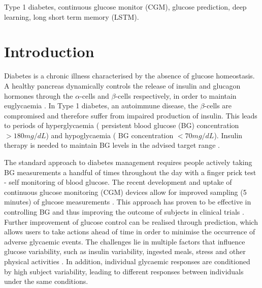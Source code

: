 \documentclass[a4paper, 10 pt, twocolumn]{IEEEtran}
\begin{document}
\begin{IEEEkeywords}
Type 1 diabetes, continuous glucose monitor (CGM), glucose prediction, deep learning, long short term memory (LSTM).
\end{IEEEkeywords}

\linespread{0.97}

\section{Introduction}\label{Section:1}
Diabetes is a chronic illness characterised by the absence of glucose homeostasis. A healthy pancreas dynamically controls the release of insulin and glucagon hormones through the $\alpha$-cells and $\beta$-cells
respectively, in order to maintain euglycaemia \cite{NationalDia-ClassDia1979}. In Type 1 diabetes, an autoimmune disease, the $\beta$-cells are compromised and therefore suffer from impaired production of insulin. This
leads to periods of hyperglycaemia ( persistent blood glucose (BG) concentration $>180 mg/dL$) and hypoglycaemia ( {BG} concentration $< 70 mg/dL$)\cite{Facchinetti-AnOnline2013, Zavitsanou-InSilico2015}. Insulin therapy
is needed to maintain  {BG} levels in the advised target range \cite{Vettoretti-Type1Dia2018}.

 The standard approach to diabetes management requires people actively taking  {BG} measurements a handful of times throughout the day with a finger prick test - self monitoring of blood glucose. The recent development
 and uptake of continuous glucose monitoring (CGM) devices allow for improved sampling (5 minutes) of glucose measurements  { \cite{Ahmadi-AWireless2009}}. {This approach has proven to be effective in controlling BG and
 thus improving the outcome of subjects in clinical trials \cite{Facchinetti-ConGlu2016}. Further improvement of glucose control can be realised through prediction, which allows users to take actions ahead of time in
 order to minimise the occurrence of adverse glycaemic events. The challenges lie in multiple factors that influence glucose variability, such as insulin variability, ingested meals, stress and other physical activities
 \cite{Oviedo-AReview2017}.} In addition, {individual glycaemic responses are conditioned by high subject variability\cite{Vettoretti-Type1Dia2018,Pesl-AnAdvBolus2016}, leading to different responses between individuals
 under the same conditions.}
\end{document}
